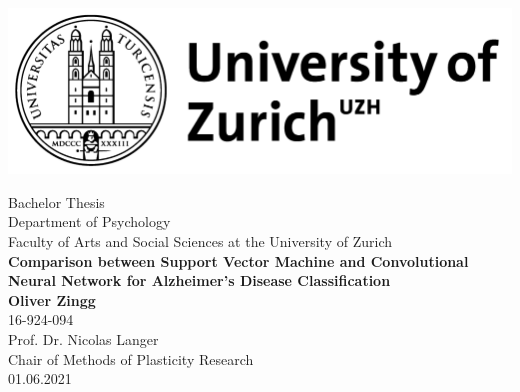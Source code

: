 \begin{titlepage}

\begin{minipage}{\textwidth}
 	\vspace{-40pt}
	\begin{flushleft}
	    		\includegraphics[scale=.25]{uzhlogo}

	\end{flushleft}
\end{minipage}

\vspace{60pt}

	\begin{center}
	
		\large Bachelor Thesis\\
		\large Department of Psychology\\[3pt]
		\large Faculty of Arts and Social Sciences at the University of Zurich\\[40pt]
		\hline
		\hline
		\vspace{0.5cm}
		\LARGE \textbf{Comparison between Support Vector Machine and Convolutional Neural Network for Alzheimer's Disease Classification}\\
			\vspace{0.5cm}
		\hline
		\hline
		\vspace{1cm}
		\large \textbf{Oliver Zingg}\\
		16-924-094\\[80pt]
		
		\large Prof. Dr. Nicolas Langer\\[20pt]
		Chair of Methods of Plasticity Research\\
		

		\large 01.06.2021\\
	\end{center}
	\thispagestyle{empty}
\end{titlepage}